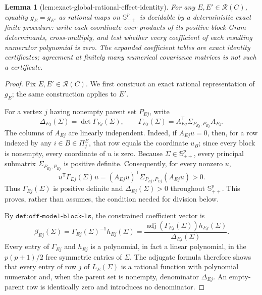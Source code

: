 \documentclass{article}
\newtheorem{lemma}{Lemma}
\begin{document}
\begin{lemma}[lem:exact-global-rational-effect-identity]\label{lem:exact-global-rational-effect-identity}
For any \(E,E'\in\mathcal R(C)\), equality \(g_E=g_{E'}\) as rational maps on \(\mathbb S^p_{++}\) is decidable by a deterministic exact finite procedure: write each coordinate over products of its positive block-Gram determinants, cross-multiply, and test whether every coefficient of each resulting numerator polynomial is zero. The expanded coefficient tables are exact identity certificates; agreement at finitely many numerical covariance matrices is not such a certificate.
\end{lemma}
\begin{proof}
Fix \(E,E'\in\mathcal R(C)\).  We first construct an exact rational representation of \(g_E\); the same construction applies to \(E'\).

For a vertex \(j\) having nonempty parent set \(P_{Ej}\), write
\[
 \Delta_{Ej}(\Sigma)=\det\Gamma_{Ej}(\Sigma),
 \qquad
 \Gamma_{Ej}(\Sigma)=A_{Ej}^{\mathsf T}
 \Sigma_{P_{Ej},P_{Ej}}A_{Ej}.
\]
The columns of \(A_{Ej}\) are linearly independent.  Indeed, if \(A_{Ej}u=0\), then, for a row indexed by any \(i\in B\in\Pi^E_j\), that row equals the coordinate \(u_B\); since every block is nonempty, every coordinate of \(u\) is zero.  Because \(\Sigma\in\mathbb S^p_{++}\), every principal submatrix \(\Sigma_{P_{Ej},P_{Ej}}\) is positive definite.  Consequently, for every nonzero \(u\),
\[
 u^{\mathsf T}\Gamma_{Ej}(\Sigma)u
 =(A_{Ej}u)^{\mathsf T}
   \Sigma_{P_{Ej},P_{Ej}}(A_{Ej}u)>0.
\]
Thus \(\Gamma_{Ej}(\Sigma)\) is positive definite and
\(\Delta_{Ej}(\Sigma)>0\) throughout \(\mathbb S^p_{++}\).  This proves, rather than assumes, the condition needed for division below.

By \(\texttt{def:off-model-block-ls}\), the constrained coefficient vector is
\[
 \beta_{Ej}(\Sigma)
 =\Gamma_{Ej}(\Sigma)^{-1}h_{Ej}(\Sigma)
 =\frac{\operatorname{adj}(\Gamma_{Ej}(\Sigma))
              h_{Ej}(\Sigma)}{\Delta_{Ej}(\Sigma)}.
\]
Every entry of \(\Gamma_{Ej}\) and \(h_{Ej}\) is a polynomial, in fact a linear polynomial, in the \(p(p+1)/2\) free symmetric entries of \(\Sigma\).  The adjugate formula therefore shows that every entry of row \(j\) of \(L_E(\Sigma)\) is a rational function with polynomial numerator and, when the parent set is nonempty, denominator \(\Delta_{Ej}\).  An empty-parent row is identically zero and introduces no denominator.


\end{proof}
\end{document}
